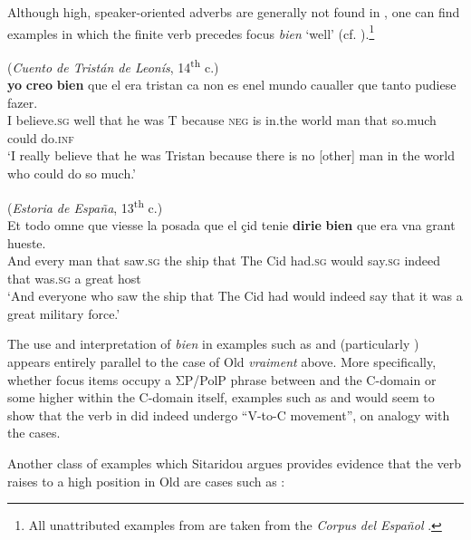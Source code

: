 \documentclass[output=paper]{LSP/langsci}
\begin{document}
\noindent Although high, speaker-oriented adverbs are generally not found in , one can find examples in which the finite verb precedes  focus \textit{bien} ‘well’ (cf. \citealt{Hernanz2006,BatlloriHernanz2013}).\footnote{All unattributed examples from  are taken from the \textit{Corpus del Español} \citep{Davies2002}.}

\noindent\parbox{\textwidth}{\ea%
    \label{ex:poole:19}
    (\textit{Cuento de Tristán de Leonís}, 14\textsuperscript{th} c.)\\
    \gll    \textbf{yo} \textbf{creo} \textbf{bien} que el era tristan ca non es enel  mundo caualler que tanto pudiese fazer.    \\
          I believe.\textsc{sg} well that he was T because \textsc{neg} is in.the world  man that so.much could    do.\textsc{inf}    	\\
    \glt ‘I really believe that he was Tristan because there is no [other] man in the world who could do so much.’
    \z}

\ea%
    \label{ex:poole:20}
    (\textit{Estoria de España}, 13\textsuperscript{th} c.)\\
    \gll   Et    todo  omne que viesse   la posada que el çid    tenie   \textbf{dirie} \textbf{bien} que era vna grant hueste.  \\
 And every man  that saw.\textsc{sg} the ship   that The Cid had.\textsc{sg} {would say.\textsc{sg}} indeed that was.\textsc{sg} a great host	\\
    \glt ‘And everyone who saw the ship that The Cid had would indeed say that it was a great military {force}.’
    \z


\noindent The use and interpretation of \textit{bien} in examples such as  and  (particularly ) appears entirely parallel to the case of Old  \textit{vraiment} above.  More specifically, whether  focus items occupy a ΣP/PolP phrase between  and the C-domain or some higher  within the C-domain itself, examples such as  and  would seem to show that the verb in  did indeed undergo ``V-to-C movement'', on analogy with the  cases.

Another class of examples which Sitaridou argues provides evidence that the verb raises to a high position in Old  are cases such as :
\end{document}

